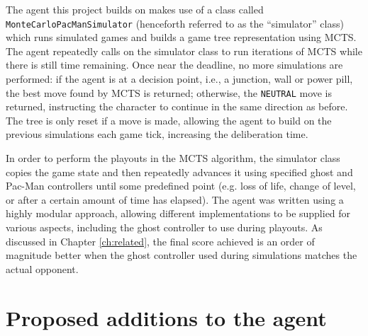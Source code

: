 The agent this project builds on makes use of a class called {\tt MonteCarloPacManSimulator} (henceforth referred to as the ``simulator'' class) which runs simulated games and builds a game tree representation using MCTS.  The agent repeatedly calls on the simulator class to run iterations of MCTS while there is still time remaining.  Once near the deadline, no more simulations are performed: if the agent is at a decision point, i.e., a junction, wall or power pill, the best move found by MCTS is returned; otherwise, the {\tt NEUTRAL} move is returned, instructing the character to continue in the same direction as before.  The tree is only reset if a move is made, allowing the agent to build on the previous simulations each game tick, increasing the deliberation time.

In order to perform the playouts in the MCTS algorithm, the simulator class copies the game state and then repeatedly advances it using specified ghost and Pac-Man controllers until some predefined point (e.g. loss of life, change of level, or after a certain amount of time has elapsed).  The agent was written using a highly modular approach, allowing different implementations to be supplied for various aspects, including the ghost controller to use during playouts.  As discussed in Chapter \ref{ch:related}, the final score achieved is an order of magnitude better when the ghost controller used during simulations matches the actual opponent.

\section{Proposed additions to the agent}
\label{sec:proposedadditions}

